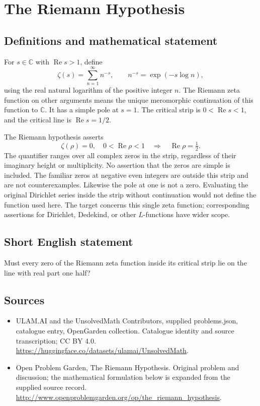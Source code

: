 \documentclass[11pt,a4paper]{article}
\begin{document}
\section*{The Riemann Hypothesis}\label{statement}

\subsection{Definitions and mathematical statement}
For $s\in\mathbb C$ with $\operatorname{Re}s>1$, define
\[
 \zeta(s)=\sum_{n=1}^{\infty}n^{-s},
 \qquad n^{-s}=\exp(-s\log n),
\]
using the real natural logarithm of the positive integer $n$. The
Riemann zeta function on other arguments means the unique meromorphic
continuation of this function to $\mathbb C$. It has a simple pole at
$s=1$. The critical strip is $0<\operatorname{Re}s<1$, and the critical
line is $\operatorname{Re}s=1/2$.

The Riemann hypothesis asserts
\[
 \zeta(\rho)=0,\quad 0<\operatorname{Re}\rho<1
       \quad\Longrightarrow\quad \operatorname{Re}\rho=\tfrac12.
\]
The quantifier ranges over all complex zeros in the strip, regardless
of their imaginary height or multiplicity. No assertion that the zeros
are simple is included. The familiar zeros at negative even integers
are outside this strip and are not counterexamples. Likewise the pole
at one is not a zero. Evaluating the original Dirichlet series inside
the strip without continuation would not define the function used here.
The target concerns this single zeta function; corresponding assertions
for Dirichlet, Dedekind, or other $L$-functions have wider scope.
\subsection{Short English statement}
Must every zero of the Riemann zeta function inside its critical strip lie on the line with real part one half?
\subsection{Sources}
\begin{itemize}
\item[S1] ULAM.AI and the UnsolvedMath Contributors, supplied problems.json, catalogue entry, OpenGarden collection. Catalogue identity and source transcription; CC BY 4.0.
\url{https://huggingface.co/datasets/ulamai/UnsolvedMath}.
\item[S2] Open Problem Garden, The Riemann Hypothesis. Original problem and discussion; the mathematical formulation below is expanded from the supplied source record.
\url{http://www.openproblemgarden.org/op/the_riemann_hypothesis}.
\end{itemize}
\end{document}
